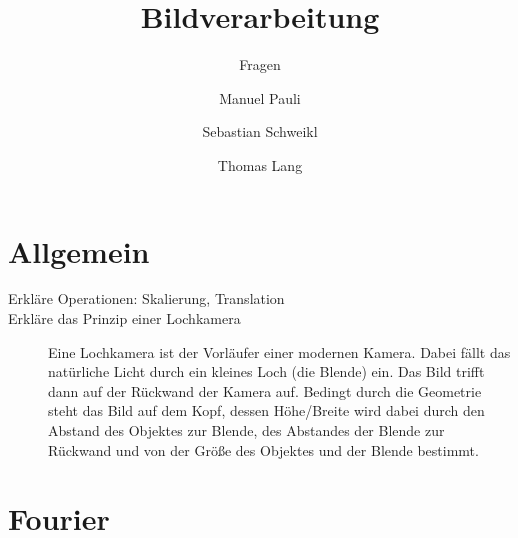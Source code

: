 
\usepackage[pdftex]{graphicx}  


\newcommand{\INT}[1]{\text{d#1}}
\newcommand{\INTM}[1]{\text{d} #1}
\newcommand{\INTMM}[2]{\text{d#1}_{#2}}
\renewcommand{\T}[1]{\text{#1 }}
\newcommand{\DIFF}[2]{\frac{\INT{#1}}{\INT{#2}}}
\renewcommand{\theta}{\vartheta}

\title{Bildverarbeitung}
\subtitle{Fragen}
\author{Manuel Pauli\and{}Sebastian Schweikl\and{}Thomas Lang}

\maketitle
\section{Allgemein} 
\begin{description}
	\item[Erkläre Operationen: Skalierung, Translation]      
	\item[Erkläre das Prinzip einer Lochkamera]
      Eine Lochkamera ist der Vorläufer einer modernen Kamera. Dabei fällt
      das natürliche Licht durch ein kleines Loch (die Blende) ein. Das Bild
      trifft dann auf der Rückwand der Kamera auf. Bedingt durch die Geometrie
      steht das Bild auf dem Kopf, dessen Höhe/Breite wird dabei durch den
      Abstand des Objektes zur Blende, des Abstandes der Blende zur Rückwand
      und von der Größe des Objektes und der Blende bestimmt.
\end{description}	

\section{Fourier}
